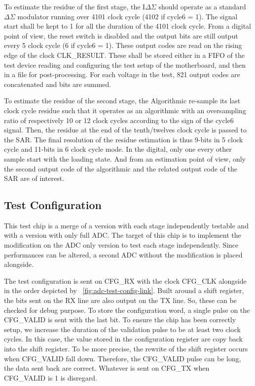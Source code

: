 To estimate the residue of the first stage, the I\(\Delta \Sigma\) should operate as a standard \(\Delta \Sigma\) modulator running over 4101 clock cycle (4102 if cycle6 = 1). The signal start shall be kept to 1 for all the duration of the 4101 clock cycle. From a digital point of view, the reset switch is disabled and the output bits are still output every 5 clock cycle (6 if cycle6 = 1). These output codes are read on the rising edge of the clock CLK\_RESULT\@. These shall be stored either in a FIFO of the test device reading and configuring the test setup of the motherboard, and then in a file for post-processing. For each voltage in the test, 821 output codes are concatenated and bits are summed.

To estimate the residue of the second stage, the Algorithmic re-sample its last clock cycle residue such that it operates as an algorithmic with an oversampling ratio of respectively 10 or 12 clock cycles according to the sign of the cycle6 signal. Then, the residue at the end of the tenth/twelves clock cycle is passed to the SAR\@. The final resolution of the residue estimation is thus 9-bits in 5 clock cycle and 11-bits in 6 clock cycle mode. In the digital, only one every other sample start with the loading state. And from an estimation point of view, only the second output code of the algorithmic and the related output code of the SAR are of interest.

\subsection{Test Configuration}
This test chip is a merge of a version with each stage independently testable and with a version with only full ADC\@. The target of this chip is to implement the modification on the ADC only version to test each stage independently. Since performances can be altered, a second ADC without the modification is placed alongside.

The test configuration is sent on CFG\_RX with the clock CFG\_CLK alongside in the order depicted by \figurename~\ref{fig:adc-test-config-link}. Built around a shift register, the bits sent on the RX line are also output on the TX line. So, these can be checked for debug purpose. To store the configuration word, a single pulse on the CFG\_VALID is sent with the last bit. To ensure the chip has been correctly setup, we increase the duration of the validation pulse to be at least two clock cycles. In this case, the value stored in the configuration register are copy back into the shift register. To be more precise, the rewrite of the shift register occurs when CFG\_VALID fall down. Therefore, the CFG\_VALID pulse can be long, the data sent back are correct. Whatever is sent on CFG\_TX when CFG\_VALID is 1 is disregard.

